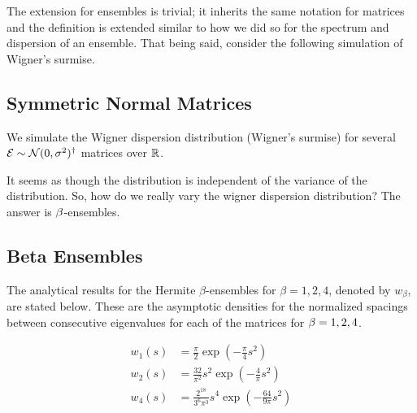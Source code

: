 The extension for ensembles is trivial; it inherits the same notation for matrices and the definition is extended similar to how we
did so for the spectrum and dispersion of an ensemble. That being said, consider the following simulation of Wigner's surmise.

\newpage


\subsection{Symmetric Normal Matrices}

We simulate the Wigner dispersion distribution (Wigner's surmise) for several $\mathcal{E} \sim \mathcal{N}(0, \sigma^2)^\dagger$ matrices over $\mathbb{R}$.



It seems as though the distribution is independent of the variance of the distribution. So, how do we really vary the wigner dispersion distribution?
The answer is $\beta$-ensembles.

\newpage
\subsection{Beta Ensembles}

The analytical results for the Hermite $\beta$-ensembles for $\beta = 1, 2, 4$, denoted by $w_\beta$, are stated below.
These are the asymptotic densities for the normalized spacings between consecutive eigenvalues for each of the matrices for $\beta = 1,2,4$.

\begin{align*}
  w_1(s) &= \frac{\pi}{2} \exp(-\frac{\pi}{4}s^2) \\
  w_2(s) &= \frac{32}{\pi^2} s^2 \exp(-\frac{4}{\pi}s^2) \\
  w_4(s) &= \frac{2^{18}}{3^{6}\pi^3} s^4 \exp(-\frac{64}{9\pi}s^2) \\
\end{align*}


